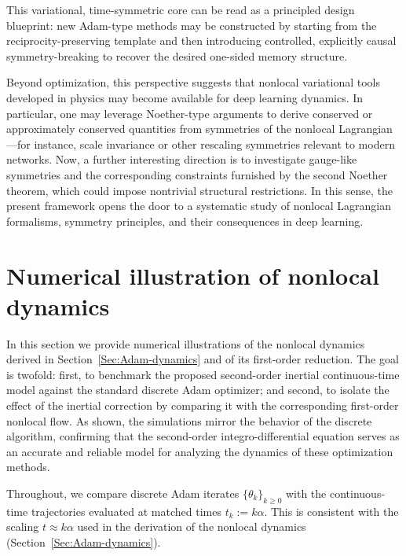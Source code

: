 \documentclass{article} %
\begin{document}
This variational, time-symmetric core can be read as a principled design blueprint: new Adam-type methods may be constructed by starting from the reciprocity-preserving template and then introducing controlled, explicitly causal symmetry-breaking to recover the desired one-sided memory structure.

Beyond optimization, this perspective suggests that nonlocal variational tools developed in physics may become available for deep learning dynamics. In particular, one may leverage Noether-type arguments to derive conserved or approximately conserved quantities from symmetries of the nonlocal Lagrangian---for instance, scale invariance or other rescaling symmetries relevant to modern networks. Now, a further interesting direction is to investigate gauge-like symmetries and the corresponding constraints furnished by the second Noether theorem, which could impose nontrivial structural restrictions. In this sense, the present framework opens the door to a systematic study of nonlocal Lagrangian formalisms, symmetry principles, and their consequences in deep learning.

\section{Numerical illustration of nonlocal dynamics}\label{sec:Numerical_Simulations}

In this section we provide numerical illustrations of the nonlocal dynamics derived in Section~\ref{Sec:Adam-dynamics} and of its first-order reduction. The goal is twofold: first, to benchmark the proposed second-order inertial continuous-time model against the standard discrete Adam optimizer; and second, to isolate the effect of the inertial correction by comparing it with the corresponding first-order nonlocal flow.  As shown, the simulations mirror the behavior of the discrete algorithm, confirming that the second-order integro-differential equation serves as an accurate and reliable model for analyzing the dynamics of these optimization methods.

Throughout, we compare discrete Adam iterates $\{\theta_k\}_{k\ge 0}$ with the continuous-time trajectories evaluated at matched times $t_k := k\alpha$. This is consistent with the scaling $t \approx k\alpha$ used in the derivation of the nonlocal dynamics (Section~\ref{Sec:Adam-dynamics}).
\end{document}
